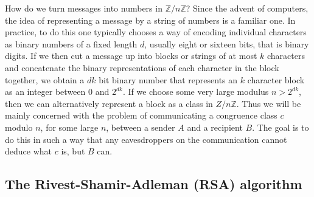 \documentclass{article}
\newcommand{\Z}{\mathbb{Z}}
\theoremstyle{definition}\newtheorem{definition}{Definition}
\theoremstyle{definition}\newtheorem*{remark}{Remark}
\theoremstyle{definition}\newtheorem*{example}{Example}
\theoremstyle{definition}\newtheorem*{note}{Note}
\begin{document}
How do we turn messages into numbers in $ \Z / n\Z $? Since the advent of computers, the idea of representing a message by a string of numbers is a familiar one. In practice, to do this one typically chooses a way of encoding individual characters as binary numbers of a fixed length $ d $, usually eight or sixteen bits, that is binary digits. If we then cut a message up into blocks or strings of at most $ k $ characters and concatenate the binary representations of each character in the block together, we obtain a $ dk $ bit binary number that represents an $ k $ character block as an integer between $ 0 $ and $ 2^{dk} $. If we choose some very large modulus $ n > 2^{dk} $, then we can alternatively represent a block as a class in $ Z / n\Z $. Thus we will be mainly concerned with the problem of communicating a congruence class $ c $ modulo $ n $, for some large $ n $, between a sender $ A $ and a recipient $ B $. The goal is to do this in such a way that any eavesdroppers on the communication cannot deduce what $ c $ is, but $ B $ can.

\subsection{The Rivest-Shamir-Adleman (RSA) algorithm}
\end{document}
